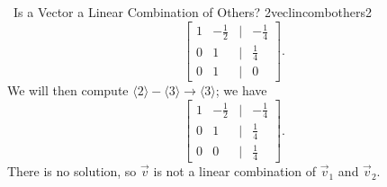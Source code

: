 \begin{example}{\Difficulty\,\Difficulty\,\,Is a Vector a Linear Combination of Others? 2}{veclincombothers2}
\begin{equation*}
\begin{bmatrix}
                    1 & -\frac{1}{2} & | & -\frac{1}{4} \\
                    0 & 1 & | & \frac{1}{4} \\
                    0 & 1 & | & 0
                \end{bmatrix}.
            \end{equation*}
            We will then compute \(\langle2\rangle-\langle3\rangle\to\langle3\rangle\); we have
            \begin{equation*}
                \begin{bmatrix}
                    1 & -\frac{1}{2} & | & -\frac{1}{4} \\
                    0 & 1 & | & \frac{1}{4} \\
                    0 & 0 & | & \frac{1}{4}
                \end{bmatrix}.
            \end{equation*}
            There is no solution, so \(\vec{v}\) is not a linear combination of \(\vec{v}_1\) and \(\vec{v}_2\).
            
        \end{example}
        \pagebreak
